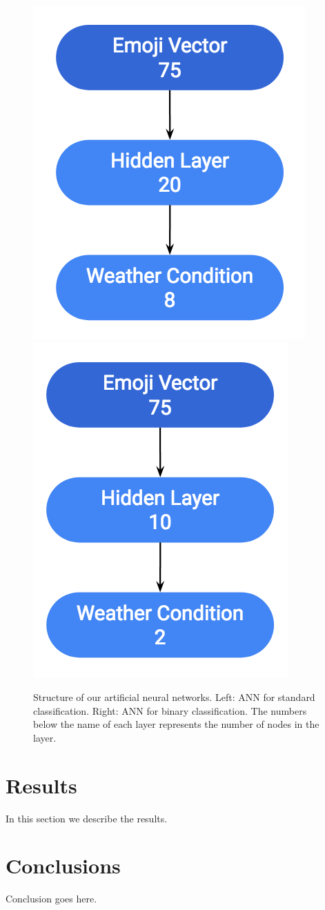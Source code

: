 \documentclass[12pt]{article}
\begin{document}
\begin{figure}[h]
\includegraphics[scale=0.7]{neuralnet}
\includegraphics[scale=0.7]{neuralnetbinary}
\centering
\caption{Structure of our artificial neural networks. Left: ANN for standard classification. Right: ANN for binary classification. The numbers below the name of each layer represents the number of nodes in the layer.}
\label{fig:neuralnet}
\end{figure}

\section{Results}\label{results}
In this section we describe the results.

\section{Conclusions}\label{conclusions}
Conclusion goes here.

\newpage


\end{document}
